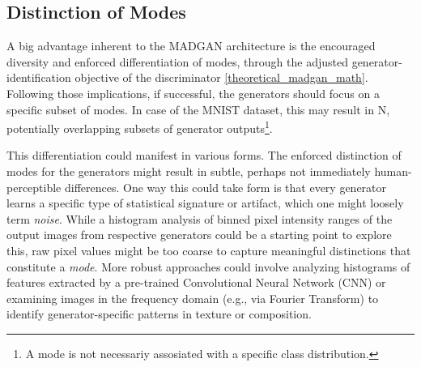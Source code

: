 \subsection{Distinction of Modes}
\noindent A big advantage inherent to the MADGAN architecture is the encouraged diversity and enforced differentiation of modes, through the adjusted generator-identification objective of the discriminator \ref{theoretical_madgan_math}. Following those implications, if successful, the generators should focus on a specific subset of modes. In case of the MNIST dataset, this may result in N, potentially overlapping subsets of generator outputs\footnote{A mode is not necessariy assosiated with a specific class distribution.}.

This differentiation could manifest in various forms. The enforced distinction of modes for the generators might result in subtle, perhaps not immediately human-perceptible differences. One way this could take form is that every generator learns a specific type of statistical signature or artifact, which one might loosely term \textit{noise}. While a histogram analysis of binned pixel intensity ranges of the output images from respective generators could be a starting point to explore this, raw pixel values might be too coarse to capture meaningful distinctions that constitute a \textit{mode}. More robust approaches could involve analyzing histograms of features extracted by a pre-trained Convolutional Neural Network (CNN) or examining images in the frequency domain (e.g., via Fourier Transform) to identify generator-specific patterns in texture or composition.

